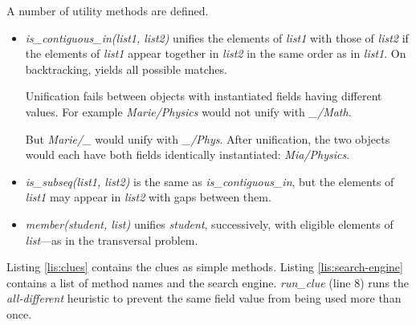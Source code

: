 A number of utility methods are defined.
\begin{itemize}
    \item \textit{is\_contiguous\_in(list1, list2)} unifies the elements of \textit{list1} with those of \textit{list2} if the elements of \textit{list1} appear together in \textit{list2} in the same order as in \textit{list1}. On backtracking, yields all possible matches. 
    
    \smallv
    Unification fails between objects with instantiated fields having different values. For example \textit{Marie/Physics} would not unify with \textit{\_/Math}.
    
    \smallv
    But \textit{Marie/\_} would unify with \textit{\_/Phys}. After unification, the two objects would each have both fields identically instantiated: \textit{Mia/Physics}.
    
    \item \textit{is\_subseq(list1, list2)} is the same as \textit{is\_contiguous\_in}, but the elements of \textit{list1} may appear in \textit{list2} with gaps between them.
    \item \textit{member(student, list)} unifies \textit{student}, successively, with eligible elements of \textit{list}---as in the transversal problem.
\end{itemize}

Listing \ref{lis:clues} contains the clues as simple methods. Listing \ref{lis:search-engine} contains a list of method names and the search engine.  \textit{run\_clue} (line 8) runs the \textit{all-different} heuristic to prevent the same field value from being used more than once.


